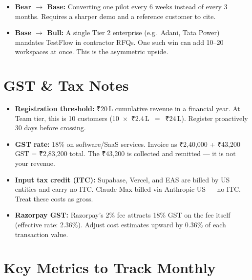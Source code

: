 \documentclass[12pt,a4paper]{article}
\newcommand{\tild}{\raisebox{0.17ex}{$\scriptstyle\sim$}}
\begin{document}
\begin{itemize}[noitemsep]
  \item \textbf{Bear $\to$ Base:} Converting one pilot every 6 weeks instead of
    every 3 months. Requires a sharper demo and a reference customer to cite.
  \item \textbf{Base $\to$ Bull:} A single Tier 2 enterprise (e.g.\ Adani,
    Tata Power) mandates TestFlow in contractor RFQs. One such win can add
    10--20 workspaces at once. This is the asymmetric upside.
\end{itemize}

\section{GST \& Tax Notes}

\begin{itemize}[noitemsep]
  \item \textbf{Registration threshold:} ₹20\,L cumulative revenue in a
    financial year. At Team tier, this is \tild{}10 customers
    (10~$\times$~₹2.4\,L~$=$~₹24\,L). Register proactively 30 days before crossing.
  \item \textbf{GST rate:} 18\% on software/SaaS services. Invoice as
    ₹2,40,000 + ₹43,200 GST = ₹2,83,200 total. The ₹43,200 is collected
    and remitted --- it is not your revenue.
  \item \textbf{Input tax credit (ITC):} Supabase, Vercel, and EAS are billed
    by US entities and carry no ITC. Claude Max billed via Anthropic US ---
    no ITC. Treat these costs as gross.
  \item \textbf{Razorpay GST:} Razorpay's 2\% fee attracts 18\% GST on the
    fee itself (effective rate: 2.36\%). Adjust cost estimates upward by
    \tild{}0.36\% of each transaction value.
\end{itemize}

\section{Key Metrics to Track Monthly}
\end{document}

